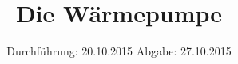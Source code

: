 

\subject{Versuchsprotokoll zum Versuch Nr. 206}
\title{Die Wärmepumpe}
\date{
  Durchführung: 20.10.2015
  \hspace{3em}
  Abgabe: 27.10.2015
}



\maketitle
\thispagestyle{empty}
\tableofcontents
\newpage






\printbibliography


